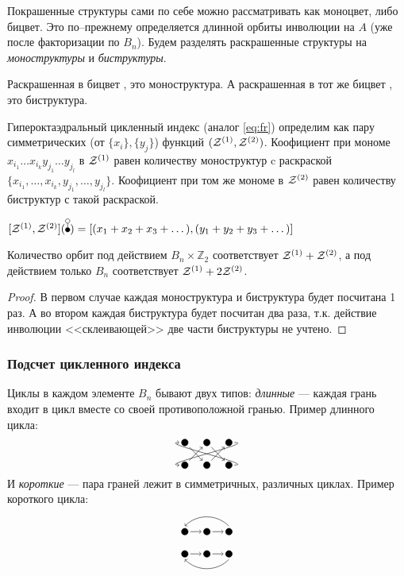 \begin{proposal}
Покрашенные структуры сами по себе можно рассматривать как моноцвет, либо
бицвет. Это по--прежнему определяется длинной орбиты инволюции на $A$ (уже
после факторизации по $B_n$). Будем разделять раскрашенные структуры на
\emph{моноструктуры} и \emph{биструктуры}. 
\end{proposal}

\begin{example}
Раскрашенная в бицвет \dA, это моноструктура. А раскрашенная в тот же бицвет
\dB, это биструктура.
\end{example}

\begin{proposal}
Гипероктаэдральный цикленный индекс (аналог \ref{eq:fr}) определим как пару
симметрических (от $\{x_i\}, \{y_j\}$) функций $(\mathcal Z^{(1)}, \mathcal Z^{(2)})$. Коофициент при
мономе $x_{i_1} \dots x_{i_k} y_{j_1} \dots y_{j_l}$ в $\mathcal Z^{(1)}$
равен количеству моноструктур c раскраской $\{x_{i_1}, \dots, x_{i_k}, y_{j_1},
\dots, y_{j_l}\}$. Коофициент при том же мономе в $\mathcal Z^{(2)}$ равен количеству
биструктур с такой раскраской. 
\end{proposal}

\begin{example}
$[\Zone, \Ztwo](\dB) = [(x_1 + x_2 + x_3 + \dots), (y_1 + y_2 + y_3 + \dots)]$
\end{example}

\begin{statement}
Количество орбит под действием $B_n \times \mathbb Z_2$ соответствует $\mathcal
Z^{(1)} + \mathcal Z^{(2)}$, а под действием только $B_n$ соответствует $\mathcal Z^{(1)} + 2\mathcal
Z^{(2)}$. 
\end{statement}
\begin{proof}
В первом случае каждая моноструктура и биструктура будет посчитана 1 раз.
А во втором каждая биструктура будет посчитан два раза, т.к. действие инволюции
<<склеивающей>> две части биструктуры не учтено.
\end{proof}

\subsubsection{Подсчет цикленного индекса}
\begin{remark}
Циклы в каждом элементе $B_n$ бывают двух типов:
\emph{длинные} --- каждая грань входит в цикл вместе со своей противоположной
гранью. Пример длинного цикла: $$\dhoB$$
И \emph{короткие} --- пара граней
лежит в симметричных, различных циклах. Пример короткого цикла: $$\dhoA$$
\end{remark}

